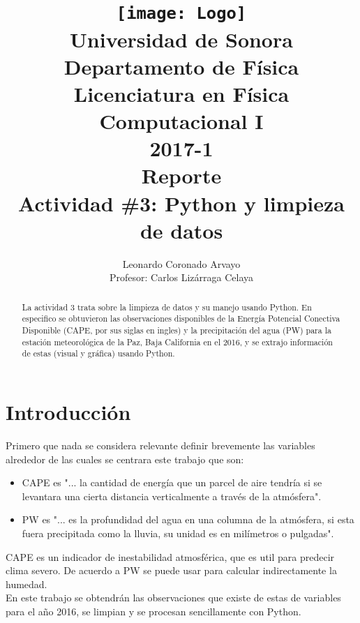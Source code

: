 \documentclass[12pt,letterpaper]{article}
\author{
Leonardo Coronado Arvayo\\
Profesor: Carlos Lizárraga Celaya   \vspace*{1.25in}}
\title{	\texttt{[image: Logo]} \\
Universidad de Sonora \\
{\small Departamento de Física \\
Licenciatura en Física \\
Computacional I \\
2017-1 \\
\vspace{0.55in} Reporte}\\ 
{\Huge Actividad \#3: Python y limpieza de datos}\\
\vspace*{1.0in}}
\begin{document}
	\maketitle
\newpage
	\tableofcontents
\pagebreak

\begin{abstract}

La actividad 3  trata sobre la limpieza de datos y su manejo usando Python. En especifico se obtuvieron las observaciones disponibles de la Energía Potencial Conectiva Disponible (CAPE, por sus siglas en ingles) y la precipitación del agua (PW) para la estación meteorológica de la Paz, Baja California en el 2016, y se extrajo información de estas (visual y gráfica) usando Python.

\end{abstract}


\section{Introducción}


Primero que nada se considera relevante definir brevemente las variables alrededor de las cuales se centrara este trabajo que son:

\begin{itemize}
\item CAPE es "... la cantidad de energía que un parcel de aire tendría si se levantara una cierta distancia verticalmente a través de la atmósfera"\cite{a}.
\item PW es "... es la profundidad del agua en una columna de la atmósfera, si esta fuera precipitada como la lluvia, su unidad es en milímetros o pulgadas"\cite{b}.
\end{itemize}

CAPE es un indicador de inestabilidad atmosférica, que es util para predecir clima severo\cite{a}. De acuerdo a \cite{b} PW se puede usar para calcular indirectamente la humedad. \\
En este trabajo se obtendrán las observaciones que existe de estas de variables para el año 2016, se limpian y se procesan sencillamente con Python.
 
\end{document}
